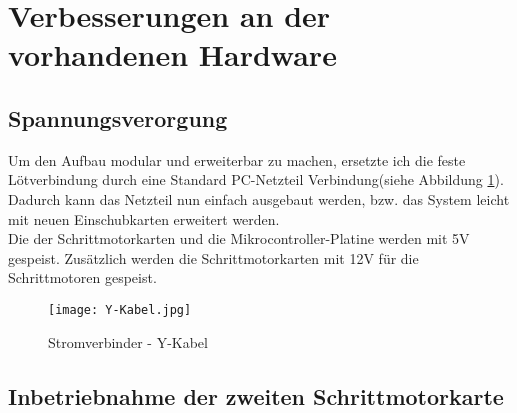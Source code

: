\section{Verbesserungen an der vorhandenen Hardware}
\subsection{Spannungsverorgung}
Um den Aufbau modular und erweiterbar zu machen, ersetzte ich die feste Lötverbindung durch eine Standard PC-Netzteil Verbindung(siehe Abbildung \ref{fig:Y-Kabel}). Dadurch kann das Netzteil nun einfach ausgebaut werden, bzw. das System leicht mit neuen Einschubkarten erweitert werden.\\
Die  der Schrittmotorkarten und die Mikrocontroller-Platine werden mit 5V gespeist. Zusätzlich werden die Schrittmotorkarten mit 12V für die Schrittmotoren gespeist.
\begin{figure}[h]
\centering
\texttt{[image: Y-Kabel.jpg]}
\caption{Stromverbinder - Y-Kabel}
\label{fig:Y-Kabel}
\end{figure}

\subsection{Inbetriebnahme der zweiten Schrittmotorkarte}

